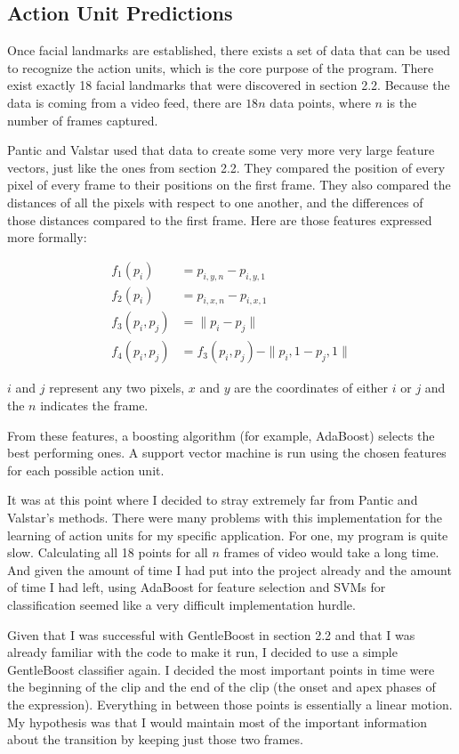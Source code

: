 \documentclass[13pt,letterpaper]{scrartcl}
\begin{document}
	\subsection{Action Unit Predictions}
	Once facial landmarks are established, there exists a set of data that can be used to recognize the action units, which is the core purpose of the program. There exist exactly 18 facial landmarks that were discovered in section 2.2. Because the data is coming from a video feed, there are $18n$ data points, where $n$ is the number of frames captured. 
	
	Pantic and Valstar used that data to create some very more very large feature vectors, just like the ones from section 2.2. They compared the position of every pixel of every frame to their positions on the first frame. They also compared the distances of all the pixels with respect to one another, and the differences of those distances compared to the first frame. Here are those features expressed more formally:
	
	\begin{align}
	f_1(p_i) &= p_{i,y,n} - p_{i,y,1} \\
	f_2(p_i) &= p_{i,x,n} - p_{i,x,1} \\
	f_3(p_i, p_j) &= \parallel p_i - p_j \parallel \\
	f_4(p_i, p_j) &= f_3(p_i, p_j) - \parallel p_i,1 - p_j,1 \parallel
	\end{align}
	
	$i$ and $j$ represent any two pixels, $x$ and $y$ are the coordinates of either $i$ or $j$ and the $n$ indicates the frame.
	
	From these features, a boosting algorithm (for example, AdaBoost) selects the best performing ones. A support vector machine is run using the chosen features for each possible action unit.
	
	It was at this point where I decided to stray extremely far from Pantic and Valstar's methods. There were many problems with this implementation for the learning of action units for my specific application. For one, my program is quite slow. Calculating all 18 points for all $n$ frames of video would take a long time. And given the amount of time I had put into the project already and the amount of time I had left, using AdaBoost for feature selection and SVMs for classification seemed like a very difficult implementation hurdle.
	
	Given that I was successful with GentleBoost in section 2.2 and that I was already familiar with the code to make it run, I decided to use a simple GentleBoost classifier again. I decided the most important points in time were the beginning of the clip and the end of the clip (the onset and apex phases of the expression). Everything in between those points is essentially a linear motion. My hypothesis was that I would maintain most of the important information about the transition by keeping just those two frames.
	
\end{document}
